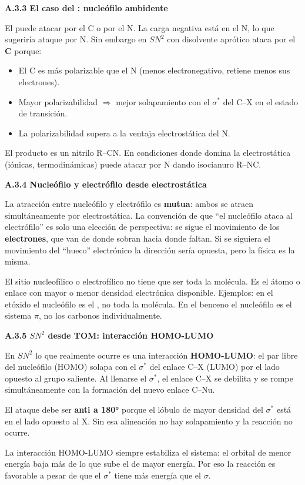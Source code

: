 \label{sec:anexo:nucleofilicidad:cn}
\textbf{A.3.3 El caso del : nucleófilo ambidente}

El  puede atacar por el C o por el N. La carga negativa está 
en el N, lo que sugeriría ataque por N. Sin embargo en $SN^2$ con 
disolvente aprótico ataca por el \textbf{C} porque:

\begin{itemize}
\item El C es más polarizable que el N (menos electronegativo, retiene 
menos sus electrones).
\item Mayor polarizabilidad $\Rightarrow$ mejor solapamiento con el 
$\sigma^*$ del C--X en el estado de transición.
\item La polarizabilidad supera a la ventaja electrostática del N.
\end{itemize}

El producto es un nitrilo R--CN. En condiciones donde domina la 
electrostática (iónicas, termodinámicas) puede atacar por N dando 
isocianuro R--NC.

\label{sec:anexo:nucleofilicidad:electro}
\textbf{A.3.4 Nucleófilo y electrófilo desde electrostática}

La atracción entre nucleófilo y electrófilo es \textbf{mutua}: ambos 
se atraen simultáneamente por electrostática. La convención de que 
``el nucleófilo ataca al electrófilo'' es solo una elección de 
perspectiva: se sigue el movimiento de los \textbf{electrones}, 
que van de donde sobran hacia donde faltan. Si se siguiera el 
movimiento del ``hueco'' electrónico la dirección sería opuesta, 
pero la física es la misma.

El sitio nucleofílico o electrofílico no tiene que ser toda la 
molécula. Es el átomo o enlace con mayor o menor densidad electrónica 
disponible. Ejemplos: en el etóxido  el nucleófilo es 
el , no toda la molécula. En el benceno el nucleófilo es el 
sistema $\pi$, no los carbonos individualmente.

\label{sec:anexo:nucleofilicidad:homo}
\textbf{A.3.5 $SN^2$ desde TOM: interacción HOMO-LUMO}

En $SN^2$ lo que realmente ocurre es una interacción 
\textbf{HOMO-LUMO}: el par libre del nucleófilo (HOMO) solapa con 
el $\sigma^*$ del enlace C--X (LUMO) por el lado opuesto al grupo 
saliente. Al llenarse el $\sigma^*$, el enlace C--X se debilita y 
se rompe simultáneamente con la formación del nuevo enlace C--Nu.

El ataque debe ser \textbf{anti a 180°} porque el lóbulo de mayor 
densidad del $\sigma^*$ está en el lado opuesto al X. Sin esa 
alineación no hay solapamiento y la reacción no ocurre.

La interacción HOMO-LUMO siempre estabiliza el sistema: el orbital 
de menor energía baja más de lo que sube el de mayor energía. Por 
eso la reacción es favorable a pesar de que el $\sigma^*$ tiene más 
energía que el $\sigma$.